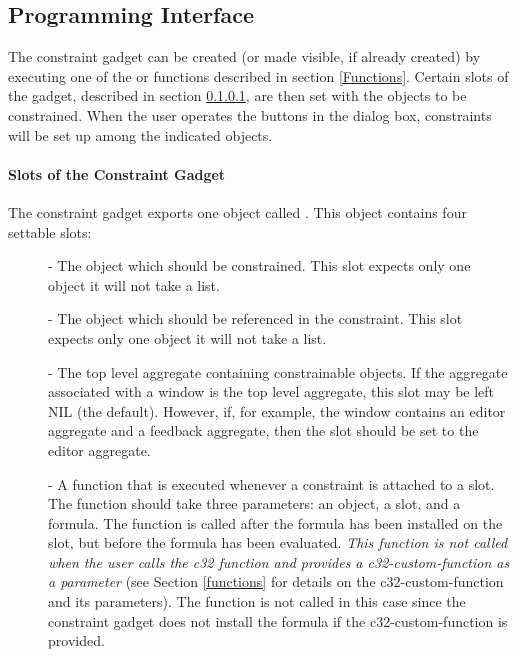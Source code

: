 \subsection{Programming Interface}

The constraint gadget can be created (or made visible, if already created)
by executing one of the  or  functions described in
section \ref{Functions}.  Certain slots of the gadget, described
in section \ref{cg-parameters}, are then set with the objects to be constrained.
When the user operates the buttons in the dialog box, constraints will be
set up among the indicated objects.


\paragraph{Slots of the Constraint Gadget}
\label{cg-parameters}

The constraint gadget exports one object called .
This object contains four settable slots:

\begin{description}
\item[]  - The object which should be constrained. This
slot expects only one object \dash it will not take a list.

\item[]  - The object which should be referenced in the
constraint. This slot expects only one object \dash it will
not take a list.

\item[]  - The top level aggregate containing constrainable
objects. If the aggregate associated with a window is
the top level aggregate, this slot may be left NIL (the
default). However, if, for example, the window contains an editor aggregate
and a feedback aggregate, then the  slot should
be set to the editor aggregate.

\item[]  - A function that is executed whenever a constraint
is attached to a slot. The function should
take three parameters: an object, a slot, and a formula. The function
is called after the formula has been installed on the slot, but before
the formula has been evaluated.
{\it This function is not called when the user calls the c32 function and
provides a c32-custom-function as a parameter} (see Section \ref{functions}
for details on the c32-custom-function and its parameters). The function is not
called in this case since the constraint gadget does not install the
formula if the c32-custom-function is provided.
\end{description}

